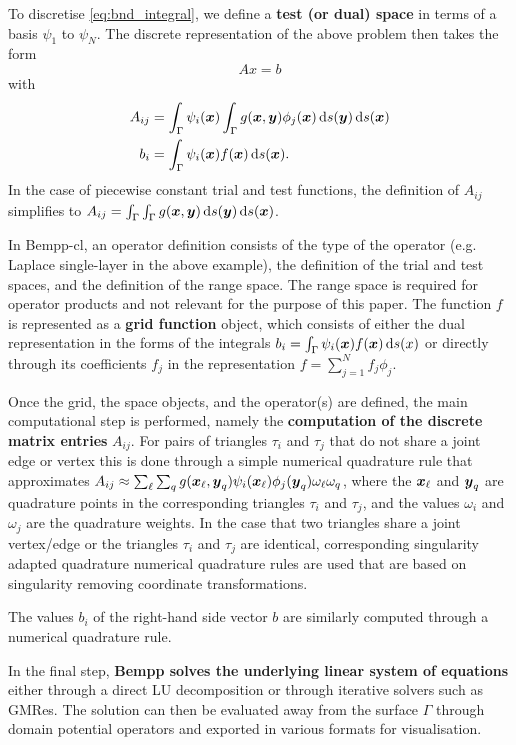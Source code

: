 To discretise \cref{eq:bnd_integral}, we define a \textbf{test (or dual) space} in terms of a basis \(\psi_1\) to \(\psi_N\). The discrete representation of the above problem then takes the form
$$
Ax = b
$$
with
\begin{align*}
A_{ij} &= \int_{\Gamma}\psi_i(\boldsymbol{x})\int_{\Gamma}g(\boldsymbol{x}, \boldsymbol{y})\phi_j(\boldsymbol{x})\,\mathrm{d}s(\boldsymbol{y})\,\mathrm{d}s(\boldsymbol{x})\\
b_i &= \int_{\Gamma}\psi_i(\boldsymbol{x})f(\boldsymbol{x})\,\mathrm{d}s(\boldsymbol{x}).
\end{align*}
In the case of piecewise constant trial and test functions, the definition of $A_{ij}$ simplifies to $A_{ij} = \int_{\Gamma}\int_{\Gamma}g(\boldsymbol{x}, \boldsymbol{y})\,\mathrm{d}s(\boldsymbol{y})\,\mathrm{d}s(\boldsymbol{x})$.

In Bempp-cl, an operator definition consists of the type of the operator (e.g. Laplace single-layer in the above example),
the definition of the trial and test spaces, and the definition of the range space. The range space is required for operator
products and not relevant for the purpose of this paper. The function $f$ is represented as a \textbf{grid function} object, which
consists of either the dual representation in the forms of the integrals $b_i = \int_{\Gamma}\psi_i(\boldsymbol{x})f(\boldsymbol{x})\,\mathrm{d}s(x)$ or directly through its coefficients $f_j$ in the representation $f=\sum_{j=1}^N f_j\phi_j$.

Once the grid, the space objects, and the operator(s) are defined, the main computational step is performed, namely the \textbf{computation of the discrete matrix entries} $A_{ij}$. For pairs of triangles $\tau_i$ and $\tau_j$ that do not share a joint edge or vertex this is done through a simple numerical quadrature rule that approximates $A_{ij}\approx \sum_{\ell}\sum_{q} g(\boldsymbol{x}_\ell, \boldsymbol{y}_q)\psi_i(\boldsymbol{x}_\ell)\phi_j(\boldsymbol{y}_q)\omega_\ell\omega_q$, where the $\boldsymbol{x}_\ell$ and $\boldsymbol{y}_q$ are quadrature points in the corresponding triangles $\tau_i$ and $\tau_j$, and the values $\omega_i$ and $\omega_j$ are the quadrature weights. In the case that two triangles share a joint vertex/edge or the triangles $\tau_i$ and $\tau_j$ are identical, corresponding singularity adapted quadrature numerical quadrature rules are used that are based on singularity removing coordinate transformations.

The values $b_i$ of the right-hand side vector $b$ are similarly computed through a numerical quadrature rule.

In the final step, \textbf{Bempp solves the underlying linear system of equations} either through a direct LU decomposition or through iterative solvers such as GMRes. The solution can then be evaluated away from the surface $\Gamma$ through domain potential operators and exported in various formats for visualisation.

